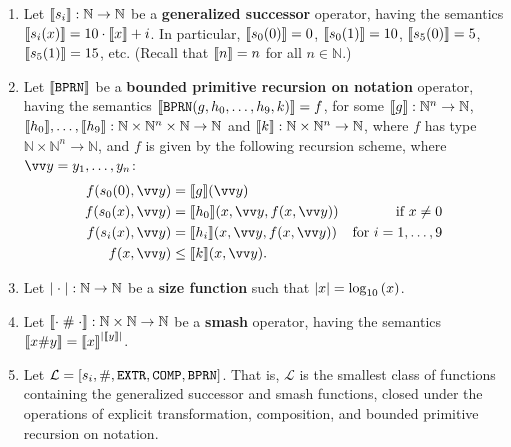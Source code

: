 \begin{definition} \cite{cobham-1965}

\begin{enumerate}[label=(\arabic*)]

\item Let $\sem{s_i} : \mathbb{N} \rightarrow \mathbb{N}$ be a
\textbf{generalized successor} operator, having the semantics $\sem{s_i\p{x}} =
10 \cdot \sem{x} + i$. In particular, $\sem{s_0\p{0}} = 0$, $\sem{s_0\p{1}} =
10$, $\sem{s_5\p{0}} = 5$, $\sem{s_5\p{1}} = 15$, etc. (Recall that $\sem{n} =
n$ for all $n \in \mathbb{N}$.)

\item Let $\sem{\mathtt{BPRN}}$ be a \textbf{bounded primitive recursion on
notation} operator, having the semantics
$\sem{\mathtt{BPRN}\p{g,h_0,\ldots,h_9,k}} = f$, for some $\sem{g} :
\mathbb{N}^n \rightarrow \mathbb{N}$, $\sem{h_0}, \ldots, \sem{h_9} :
\mathbb{N} \times \mathbb{N}^n \times \mathbb{N} \rightarrow \mathbb{N}$ and
$\sem{k} : \mathbb{N} \times \mathbb{N}^n \rightarrow \mathbb{N}$, where $f$
has type $\mathbb{N} \times \mathbb{N}^n \rightarrow \mathbb{N}$, and $f$ is
given by the following recursion scheme, where $\vect{y} =
y_1,\ldots,y_n$:\begin{align*}
%
f\p{s_0\p{0}, \vect{y}} &= \sem{g}\p{\vect{y}} \\
%
f\p{s_0\p{x}, \vect{y}} &= \sem{h_0}\p{x, \vect{y}, f\p{x, \vect{y}}} &
\text{if $x\neq 0$}\\
%
f\p{s_i\p{x}, \vect{y}} &= \sem{h_i}\p{x, \vect{y}, f\p{x, \vect{y}}} &
\text{for $i=1,\ldots,9$} \\
%
f\p{x, \vect{y}} &\leq \sem{k}\p{x, \vect{y}}.
%
\end{align*}

\item Let $\card{\mathrel{}\cdotnot\mathrel{}} : \mathbb{N} \rightarrow
\mathbb{N}$ be a \textbf{size function} such that $\card{x} = \log_{10}\p{x}$.

\item Let $\sem{\cdotnot \; \smashf{} \; \cdotnot} : \mathbb{N} \times
\mathbb{N} \rightarrow \mathbb{N}$ be a \textbf{smash} operator, having the
semantics $\sem{x \smashf{} y} = \sem{x}^\card{\sem{y}}$.

\item Let $\mathcal{L} = \seq{s_i, \smashf{}, \mathtt{EXTR}, \mathtt{COMP},
\mathtt{BPRN}}$. That is, $\mathcal{L}$ is the smallest class of functions
containing the generalized successor and smash functions, closed under the
operations of explicit transformation, composition, and bounded primitive
recursion on notation.
 
\end{enumerate}

\end{definition}

